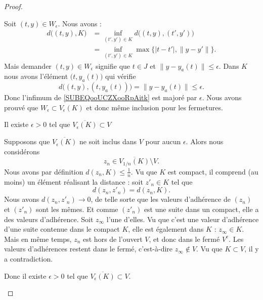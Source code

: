 \begin{proof}
\begin{subproof}
		Soit \( (t,y)\in W_{\epsilon}\). Nous avons :
		\begin{subequations}
			\begin{align}
				d\big( (t,y),K \big) & =\inf_{(t',y')\in K}d\big( (t,y),(t',y') \big)                                     \\
				                     & =\inf_{(t',y')\in K}\max\{ | t-t' |,\| y-y' \| \}.     \label{SUBEQooUCZXooRpAitk}
			\end{align}
		\end{subequations}
		Mais demander \( (t,y)\in W_{\epsilon}\) signifie que \( t\in J\) et \( \| y-y_a(t) \|\leq \epsilon\). Dans \( K \) nous avons l'élément \( \big( t,y_a(t) \big)\) qui vérifie
		\begin{equation}
			d\big( (t,y),(t,y_a(t)) \big)=\| y-y_a(t) \|\leq \epsilon.
		\end{equation}
		Donc l'infimum de \eqref{SUBEQooUCZXooRpAitk} est majoré par \( \epsilon\). Nous avons prouvé que \( W_{\epsilon}\subset V_{\epsilon}(K)\) et donc même inclusion pour les fermetures.

		\item[Il existe \( \epsilon>0\) tel que \( \overline{ V_{\epsilon}(K) }\subset V\)]

		Supposons que \( \overline{ V_{\epsilon}(K) }\) ne soit inclus dans \( V\) pour aucun \( \epsilon\). Alors nous considérons
		\begin{equation}
			z_n\in \overline{ V_{1/n}(K) }\setminus V.
		\end{equation}
		Nous avons par définition \( d(z_n,K)\leq \frac{1}{ n }\). Vu que \( K\) est compact, il comprend (au moins) un élément réalisant la distance : soit \( z'_n\in K\) tel que
		\begin{equation}
			d(z_n,z'_n)=d(z_n,K).
		\end{equation}
		Nous avons \( d(z_n,z'_n)\to 0\), de telle sorte que les valeurs d'adhérence de \( (z_n)\) et \( (z'_n)\) sont les mêmes. Et comme \( (z'_n)\) est une suite dans un compact, elle a des valeurs d'adhérence. Soit \( z_{\infty}\) l'une d'elles. Vu que c'est une valeur d'adhérence d'une suite contenue dans le compact \( K\), elle est également dans \( K\) : \( z_{\infty}\in K\). Mais en même temps, \( z_n\) est hors de l'ouvert \( V\), et donc dans le fermé \( V^c\). Les valeurs d'adhérences restent dans le fermé, c'est-à-dire \( z_{\infty}\notin V\). Vu que \( K\subset V\), il y a contradiction.

		Donc il existe \( \epsilon>0\) tel que \( \overline{ V_{\epsilon}(K) }\subset V\).


\end{subproof}
\end{proof}
